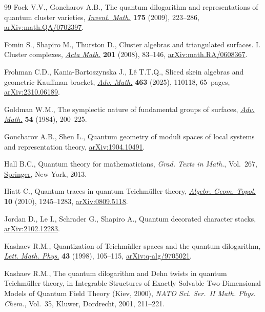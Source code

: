 \documentclass[10pt,a4paper]{amsart}
\numberwithin{equation}{section}
\theoremstyle{definition}
\begin{document}
\begin{thebibliography}{99}
Fock V.V., Goncharov A.B., The quantum dilogarithm and representations of
 quantum cluster varieties,
 \href{https://doi.org/10.1007/s00222-008-0149-3}{\textit{Invent. Math.}}
 \textbf{175} (2009), 223--286,
 \href{http://arxiv.org/abs/math.QA/0702397}{arXiv:math.QA/0702397}.

Fomin S., Shapiro M., Thurston D., Cluster algebras and triangulated surfaces.
 {I}. {C}luster complexes,
 \href{https://doi.org/10.1007/s11511-008-0030-7}{\textit{Acta Math.}}
 \textbf{201} (2008), 83--146,
 \href{http://arxiv.org/abs/math.RA/0608367}{arXiv:math.RA/0608367}.

Frohman C.D., Kania-Bartoszynska J., L\^{e} T.T.Q., Sliced skein algebras and
 geometric {K}auffman bracket,
 \href{https://doi.org/10.1016/j.aim.2025.110118}{\textit{Adv. Math.}}
 \textbf{463} (2025), 110118, 65~pages,
 \href{http://arxiv.org/abs/2310.06189}{arXiv:2310.06189}.

Goldman W.M., The symplectic nature of fundamental groups of surfaces,
 \href{https://doi.org/10.1016/0001-8708(84)90040-9}{\textit{Adv. Math.}}
 \textbf{54} (1984), 200--225.

Goncharov A.B., Shen L., Quantum geometry of moduli spaces of local systems and
 representation theory,
 \href{http://arxiv.org/abs/1904.10491}{arXiv:1904.10491}.

Hall B.C., Quantum theory for mathematicians, \textit{Grad. Texts in Math.},
 Vol.~267, \href{https://doi.org/10.1007/978-1-4614-7116-5}{Springer}, New
 York, 2013.

Hiatt C., Quantum traces in quantum {T}eichm\"{u}ller theory,
 \href{https://doi.org/10.2140/agt.2010.10.1245}{\textit{Algebr. Geom.
 Topol.}} \textbf{10} (2010), 1245--1283,
 \href{http://arxiv.org/abs/0809.5118}{arXiv:0809.5118}.

Jordan D., Le I., Schrader G., Shapiro A., Quantum decorated character stacks,
 \href{http://arxiv.org/abs/2102.12283}{arXiv:2102.12283}.

Kashaev R.M., Quantization of {T}eichm\"{u}ller spaces and the quantum
 dilogarithm, \href{https://doi.org/10.1023/A:1007460128279}{\textit{Lett.
 Math. Phys.}} \textbf{43} (1998), 105--115,
 \href{http://arxiv.org/abs/q-alg/9705021}{arXiv:q-alg/9705021}.

Kashaev R.M., The quantum dilogarithm and {D}ehn twists in quantum
 {T}eichm\"{u}ller theory, in Integrable Structures of Exactly Solvable
 Two-Dimensional Models of Quantum Field Theory ({K}iev, 2000), \textit{NATO
 Sci. Ser.~II Math. Phys. Chem.}, Vol.~35, Kluwer, Dordrecht, 2001, 211--221.


\end{thebibliography}
\end{document}
